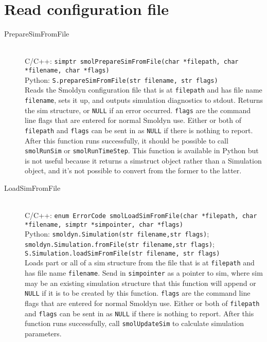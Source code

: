 \documentclass {scrbook}
\newcommand {\ttt} {\texttt}
\begin{document}
\section{Read configuration file}

\begin{description}

\item[PrepareSimFromFile]
\hfill \\
C/C++: \ttt{simptr smolPrepareSimFromFile(char *filepath, char *filename, char *flags)}\\
Python: \ttt{S.prepareSimFromFile(str filename, str flags)}\\
Reads the Smoldyn configuration file that is at \ttt{filepath} and has file name \ttt{filename}, sets it up, and outputs simulation diagnostics to stdout. Returns the sim structure, or \ttt{NULL} if an error occurred. \ttt{flags} are the command line flags that are entered for normal Smoldyn use. Either or both of \ttt{filepath} and \ttt{flags} can be sent in as \ttt{NULL} if there is nothing to report. After this function runs successfully, it should be possible to call \ttt{smolRunSim} or \ttt{smolRunTimeStep}. This function is available in Python but is not useful because it returns a simstruct object rather than a Simulation object, and it's not possible to convert from the former to the latter.

\item[LoadSimFromFile]
\hfill \\
C/C++: \ttt{enum ErrorCode smolLoadSimFromFile(char *filepath, char *filename, simptr *simpointer, char *flags)}\\
Python: \ttt{smoldyn.Simulation(str filename,str flags)}; \ttt{smoldyn.Simulation.fromFile(str filename,str flags)}; \ttt{S.Simulation.loadSimFromFile(str filename, str flags)}\\
Loads part or all of a sim structure from the file that is at \ttt{filepath} and has file name \ttt{filename}. Send in \ttt{simpointer} as a pointer to sim, where sim may be an existing simulation structure that this function will append or \ttt{NULL} if it is to be created by this function. \ttt{flags} are the command line flags that are entered for normal Smoldyn use. Either or both of \ttt{filepath} and \ttt{flags} can be sent in as \ttt{NULL} if there is nothing to report. After this function runs successfully, call \ttt{smolUpdateSim} to calculate simulation parameters.


\end{description}
\end{document}
